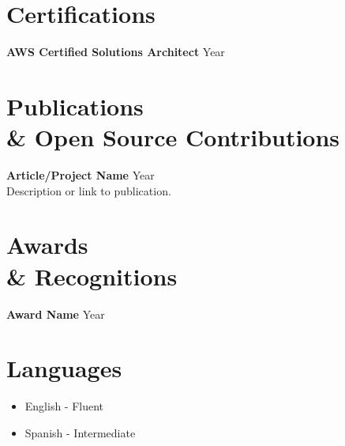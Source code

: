 \documentclass[a4paper,10pt]{article}
\begin{document}
\section*{Certifications}
\textbf{AWS Certified Solutions Architect} \hfill Year

\section*{Publications \\ & Open Source Contributions}
\textbf{Article/Project Name} \hfill Year\\
Description or link to publication.

\section*{Awards \\ & Recognitions}
\textbf{Award Name} \hfill Year

\section*{Languages}
\begin{itemize}
    \item English - Fluent
    \item Spanish - Intermediate
\end{itemize}
\end{document}
